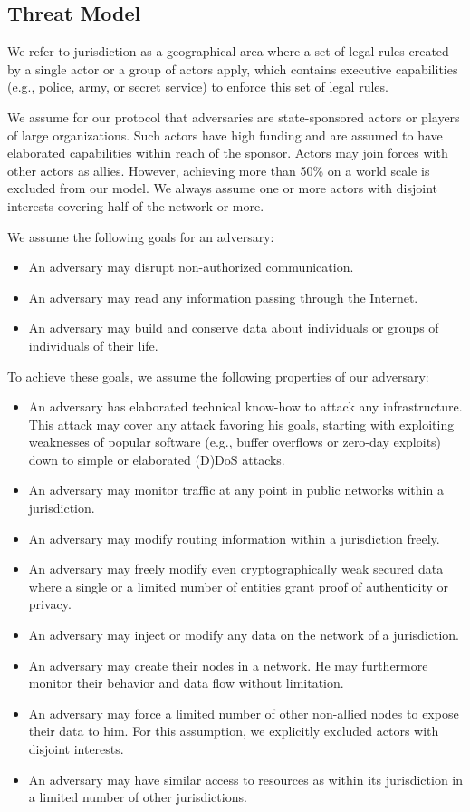 \documentclass[acmsmall, screen, review]{acmart}
\begin{document}
\subsection{Threat Model}
We refer to jurisdiction as a geographical area where a set of legal rules created by a single actor or a group of actors apply, which contains executive capabilities (e.g., police, army, or secret service) to enforce this set of legal rules.

We assume for our protocol that adversaries are state-sponsored actors or players of large organizations. Such actors have high funding and are assumed to have elaborated capabilities within reach of the sponsor. Actors may join forces with other actors as allies. However, achieving more than 50\% on a world scale is excluded from our model. We always assume one or more actors with disjoint interests covering half of the network or more. 

We assume the following goals for an adversary:
\begin{itemize}
	\item An adversary may disrupt non-authorized communication.
	\item An adversary may read any information passing through the Internet.
	\item An adversary may build and conserve data about individuals or groups of individuals of their life. 
\end{itemize}

To achieve these goals, we assume the following properties of our adversary:
\begin{itemize}
	\item An adversary has elaborated technical know-how to attack any infrastructure. This attack may cover any attack favoring his goals, starting with exploiting weaknesses of popular software (e.g., buffer overflows or zero-day exploits) down to simple or elaborated (D)DoS attacks.
	\item An adversary may monitor traffic at any point in public networks within a jurisdiction.
	\item An adversary may modify routing information within a jurisdiction freely.
	\item An adversary may freely modify even cryptographically weak secured data where a single or a limited number of entities grant proof of authenticity or privacy.
	\item An adversary may inject or modify any data on the network of a jurisdiction.
	\item An adversary may create their nodes in a network. He may furthermore monitor their behavior and data flow without limitation.
	\item An adversary may force a limited number of other non-allied nodes to expose their data to him. For this assumption, we explicitly excluded actors with disjoint interests.
	\item An adversary may have similar access to resources as within its jurisdiction in a limited number of other jurisdictions.
\end{itemize}
\end{document}
